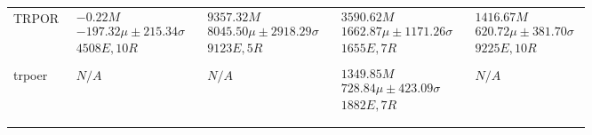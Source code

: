 \begin{tabular}{|l|p{3.2cm}|p{3.2cm}|p{3.2cm}|p{3.2cm}|}
TRPOR & $\begin{array}{c} -0.22M \\ -197.32\mu \pm 215.34\sigma \\ 4508E, 10R \end{array}$ & $\begin{array}{c} 9357.32M \\ 8045.50\mu \pm 2918.29\sigma \\ 9123E, 5R \end{array}$ & $\begin{array}{c} 3590.62M \\ 1662.87\mu \pm 1171.26\sigma \\ 1655E, 7R \end{array}$ & $\begin{array}{c} 1416.67M \\ 620.72\mu \pm 381.70\sigma \\ 9225E, 10R \end{array}$ \\ \\ \hline
trpoer & $\begin{array}{c} N/A \end{array}$ & $\begin{array}{c} N/A \end{array}$ & $\begin{array}{c} 1349.85M \\ 728.84\mu \pm 423.09\sigma \\ 1882E, 7R \end{array}$ & $\begin{array}{c} N/A \end{array}$ \\ \\ \hline
\bottomrule \\ \hline
\end{tabular}
